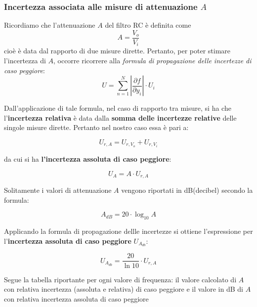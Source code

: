 \subsubsection*{Incertezza associata alle misure di attenuazione $A$}

Ricordiamo che l'attenuazione $A$ del filtro RC è definita come
\[A = \frac{V_o}{V_i}\]
cioè è data dal rapporto di due misure dirette. Pertanto, per poter stimare l'incertezza di $A$, occorre ricorrere alla \textit{formula di propagazione delle incertezze di caso peggiore}:
\[U = \sum_{n=1}^{N} \left|\frac{\partial f}{\partial y_i}\right| \cdot U_i\]

Dall'applicazione di tale formula, nel caso di rapporto tra misure, si ha che l'\textbf{incertezza relativa} è data dalla \textbf{somma delle incertezze relative} delle singole misure dirette. Pertanto nel nostro caso essa è pari a:

\[U_{r,A} = U_{r,V_o} + U_{r,V_i}\]

da cui si ha\textbf{ l'incertezza assoluta di caso peggiore}:

\[U_A = A \cdot U_{r,A}\]

Solitamente i valori di attenuazione $A$ vengono riportati in dB(decibel) secondo la formula:

\[A_{dB} = 20\cdot \log_{10} A\]

Applicando la formula di propagazione dellle incertezze si ottiene l'espressione per l'\textbf{incertezza assoluta di caso peggiore} $U_{A_{db}}$:

\[U_{A_{db}} = \frac{20}{\ln 10} \cdot U_{r,A}\]

Segue la tabella riportante per ogni valore di frequenza: il valore calcolato di $A$ con relativa incertezza (assoluta e relativa) di caso peggiore e il valore in dB di $A$ con relativa incertezza assoluta di caso peggiore

